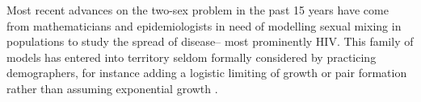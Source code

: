 
Most recent advances on the two-sex problem in the past 15 years have come from
mathematicians and epidemiologists in need of modelling sexual mixing in
populations to study the spread of disease-- most prominently HIV. This family
of models has entered into territory seldom formally considered by practicing
demographers, for instance adding a logistic limiting of growth or pair
formation rather than assuming exponential growth \citep{castillo1995logistic}.

\citet{schmitz2000note}










